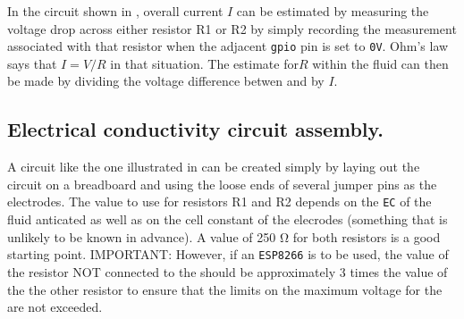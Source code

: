 In the circuit shown in , overall current $I$ can be estimated by measuring the voltage drop across either resistor R1 or R2 by simply recording the \adc measurement associated with that resistor when the adjacent \texttt{gpio} pin is set to \texttt{0V}.  Ohm's law says that $I = V/R$ in that situation. The estimate for$R$ within the fluid can then be made by dividing the voltage difference betwen  and  by $I$.  

\subsection{Electrical conductivity circuit assembly.}

A circuit like the one illustrated in  can be created simply by laying out the circuit on a breadboard and using the loose ends of several jumper pins as the electrodes. The value to use for resistors R1 and R2 depends on the \texttt{EC} of the fluid anticated as well as on the cell constant of the elecrodes (something that is unlikely to be known in advance).  A value of 250 \si{\ohm} for both resistors is a good starting point. IMPORTANT:  However, if an \texttt{ESP8266} is to be used, the value of the resistor NOT connected to the \adc should be approximately 3 times the value of the the other resistor to ensure that the limits on the maximum voltage for the \adc are not exceeded.

